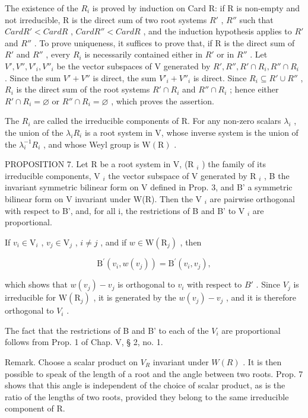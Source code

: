 The existence of the \(R_{i}\) is proved by induction on Card R: if R is non-empty and not irreducible, R is the direct sum of two root systems \(R'\) , \(R''\) such that \(Card R' < Card R\) , \(Card R'' < Card R\) , and the induction hypothesis applies to \(R'\) and \(R''\) . To prove uniqueness, it suffices to prove that, if R is the direct sum of \(R'\) and \(R''\) , every \(R_i\) is necessarily contained either in \(R'\) or in \(R''\) . Let \(V', V'', V'_i, V''_i\) be the vector subspaces of V generated by \(R', R'', R' \cap R_i, R'' \cap R_i\) . Since the sum \(V' + V''\) is direct, the sum \(V'_i + V''_i\) is direct. Since \(R_i \subseteq R' \cup R''\) , \(R_i\) is the direct sum of the root systems \(R' \cap R_i\) and \(R'' \cap R_i\) ; hence either \(R' \cap R_i = \varnothing\) or \(R'' \cap R_i = \varnothing\) , which proves the assertion.

The \(R_{i}\) are called the irreducible components of R. For any non-zero scalars \(\lambda_{i}\) , the union of the \(\lambda_{i}R_{i}\) is a root system in V, whose inverse system is the union of the \(\lambda_{i}^{-1}R_{i}\) , and whose Weyl group is \(\mathrm{W}(\mathrm{R})\) .

PROPOSITION 7. Let R be a root system in V, (R \(_{i}\) ) the family of its irreducible components, V \(_{i}\) the vector subspace of V generated by R \(_{i}\) , B the invariant symmetric bilinear form on V defined in Prop. 3, and B' a symmetric bilinear form on V invariant under W(R). Then the V \(_{i}\) are pairwise orthogonal with respect to B', and, for all i, the restrictions of B and B' to V \(_{i}\) are proportional.

If \(v_{i} \in \mathrm{V}_{i}\) , \(v_{j} \in \mathrm{V}_{j}\) , \(i \neq j\) , and if \(w \in \mathrm{W}(\mathrm{R}_j)\) , then

\[
\mathrm{B} ^ {\prime} (v _ {i}, w (v _ {j})) = \mathrm{B} ^ {\prime} (v _ {i}, v _ {j}),
\]

which shows that \(w(v_{j}) - v_{j}\) is orthogonal to \(v_{i}\) with respect to \(B'\) . Since \(V_{j}\) is irreducible for \(\mathrm{W}(\mathrm{R}_{j})\) , it is generated by the \(w(v_{j}) - v_{j}\) , and it is therefore orthogonal to \(V_{i}\) .

The fact that the restrictions of B and B' to each of the \(V_{i}\) are proportional follows from Prop. 1 of Chap. V, § 2, no. 1.

Remark. Choose a scalar product on \(V_{R}\) invariant under \(W(R)\) . It is then possible to speak of the length of a root and the angle between two roots. Prop. 7 shows that this angle is independent of the choice of scalar product, as is the ratio of the lengths of two roots, provided they belong to the same irreducible component of R.

